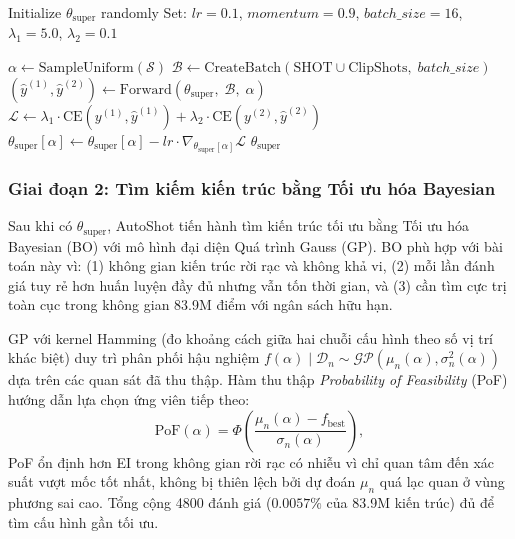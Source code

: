 \begin{algorithm}[H]
\caption{SuperNet Training (Single-Path One-Shot)}
\label{alg:supernet_training}
\begin{algorithmic}[1]
\State Initialize $\theta_{\mathrm{super}}$ randomly
\State Set: $lr = 0.1$, $momentum = 0.9$, $batch\_size = 16$, $\lambda_1 = 5.0$, $\lambda_2 = 0.1$

        \State $\alpha \gets \mathrm{SampleUniform}(\mathcal{S})$
        \State $\mathcal{B} \gets \text{CreateBatch}(\text{SHOT} \cup \text{ClipShots},\; batch\_size)$
        \State $(\hat{y}^{(1)}, \hat{y}^{(2)}) \gets \text{Forward}(\theta_{\mathrm{super}},\; \mathcal{B},\; \alpha)$
        \State $\mathcal{L} \gets \lambda_1 \cdot \mathrm{CE}(y^{(1)}, \hat{y}^{(1)}) + \lambda_2 \cdot \mathrm{CE}(y^{(2)}, \hat{y}^{(2)})$
        \State $\theta_{\mathrm{super}}[\alpha] \gets \theta_{\mathrm{super}}[\alpha] - lr \cdot \nabla_{\theta_{\mathrm{super}}[\alpha]} \mathcal{L}$
    \EndFor
\EndFor
\State \Return $\theta_{\mathrm{super}}$
\EndFunction
\end{algorithmic}
\end{algorithm}

\subsubsection{Giai đoạn 2: Tìm kiếm kiến trúc bằng Tối ưu hóa Bayesian}
\label{subsubsec:bayesian_search}

Sau khi có $\theta_{\mathrm{super}}$, AutoShot tiến hành tìm kiến trúc tối ưu bằng Tối ưu hóa Bayesian (BO) với mô hình đại diện Quá trình Gauss (GP). BO phù hợp với bài toán này vì: (1) không gian kiến trúc rời rạc và không khả vi, (2) mỗi lần đánh giá tuy rẻ hơn huấn luyện đầy đủ nhưng vẫn tốn thời gian, và (3) cần tìm cực trị toàn cục trong không gian 83.9M điểm với ngân sách hữu hạn.

GP với kernel Hamming (đo khoảng cách giữa hai chuỗi cấu hình theo số vị trí khác biệt) duy trì phân phối hậu nghiệm $f(\alpha) \mid \mathcal{D}_n \sim \mathcal{GP}(\mu_n(\alpha), \sigma_n^2(\alpha))$ dựa trên các quan sát đã thu thập. Hàm thu thập \textit{Probability of Feasibility} (PoF) hướng dẫn lựa chọn ứng viên tiếp theo:
\begin{equation}
    \mathrm{PoF}(\alpha) = \Phi\!\left(\frac{\mu_n(\alpha) - f_{\mathrm{best}}}{\sigma_n(\alpha)}\right),
    \label{eq:pof}
\end{equation}
PoF ổn định hơn EI trong không gian rời rạc có nhiễu vì chỉ quan tâm đến xác suất vượt mốc tốt nhất, không bị thiên lệch bởi dự đoán $\mu_n$ quá lạc quan ở vùng phương sai cao. Tổng cộng 4800 đánh giá ($0.0057\%$ của 83.9M kiến trúc) đủ để tìm cấu hình gần tối ưu.

